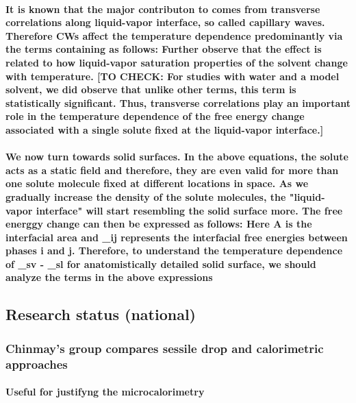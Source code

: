 \documentclass[a4paper,12pt,single,pdftex]{scrartcl}
\begin{document}
\label{ID_1305040262}\paragraph{ It is known that the major contributon to \chi comes from transverse correlations along liquid-vapor interface, so called capillary waves. Therefore CWs affect the temperature dependence predominantly via the terms containing \chi as follows: Further observe that the effect is related to how liquid-vapor saturation properties of the solvent change with temperature. [TO CHECK: For studies with water and a model solvent, we did observe that unlike other terms, this term is statistically significant. Thus, transverse correlations play an important role in the temperature dependence of the free energy change associated with a single solute fixed at the liquid-vapor interface.]}

\label{ID_276381896}\paragraph{ We now turn towards solid surfaces. In the above equations, the solute acts as a static field and therefore, they are even valid for more than one solute molecule fixed at different locations in space. As we gradually increase the density of the solute molecules, the "liquid-vapor interface" will start  resembling the solid surface more. The free energgy change \Delta \mu can then be expressed as follows: Here A is the interfacial area and \gamma_{ij} represents the interfacial free energies between phases i and j. Therefore, to understand the temperature dependence of \gamma_{sv} - \gamma_{sl} for anatomistically detailed solid surface, we should analyze the terms in the above expressions}

\label{ID_374576713}\subsection{Research status (national)}

\label{ID_135785427}\subsubsection{Chinmay's group compares sessile drop and calorimetric approaches}

\label{ID_1532965186}\paragraph{Useful for justifyng the microcalorimetry}
\end{document}
